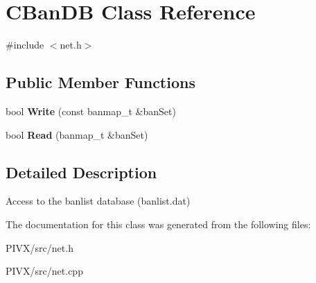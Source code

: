 \hypertarget{class_c_ban_d_b}{}\section{C\+Ban\+DB Class Reference}
\label{class_c_ban_d_b}


{\ttfamily \#include $<$net.\+h$>$}

\subsection*{Public Member Functions}
\begin{DoxyCompactItemize}
\item 
\mbox{\label{class_c_ban_d_b_a0550a06c6b5987869f557467fe7f9896}} 
bool {\bfseries Write} (const banmap\+\_\+t \&ban\+Set)
\item 
\mbox{\label{class_c_ban_d_b_aa3bb0e398409c933bf79a9af56c807f2}} 
bool {\bfseries Read} (banmap\+\_\+t \&ban\+Set)
\end{DoxyCompactItemize}


\subsection{Detailed Description}
Access to the banlist database (banlist.\+dat) 

The documentation for this class was generated from the following files\+:\begin{DoxyCompactItemize}
\item 
P\+I\+V\+X/src/net.\+h\item 
P\+I\+V\+X/src/net.\+cpp\end{DoxyCompactItemize}
